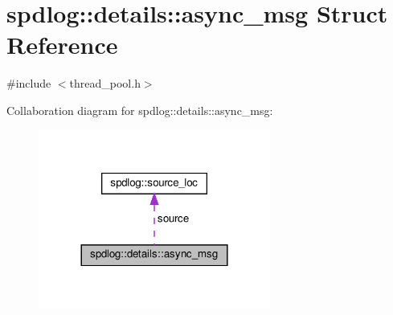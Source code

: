 \hypertarget{structspdlog_1_1details_1_1async__msg}{}\section{spdlog\+:\+:details\+:\+:async\+\_\+msg Struct Reference}
\label{structspdlog_1_1details_1_1async__msg}


{\ttfamily \#include $<$thread\+\_\+pool.\+h$>$}



Collaboration diagram for spdlog\+:\+:details\+:\+:async\+\_\+msg\+:
\nopagebreak
\begin{figure}[H]
\begin{center}
\leavevmode
\includegraphics[width=216pt]{structspdlog_1_1details_1_1async__msg__coll__graph}
\end{center}
\end{figure}
